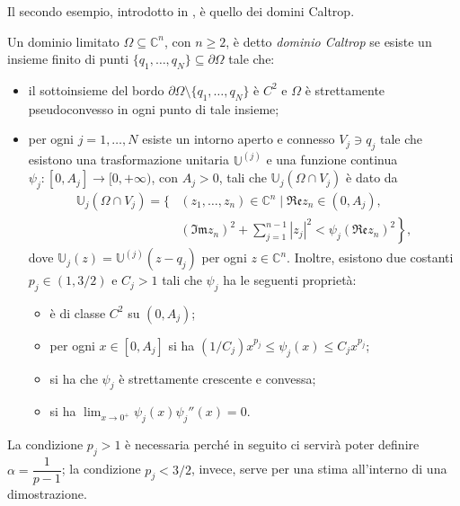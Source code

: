 Il secondo esempio, introdotto in \cite{BM}, è quello dei domini Caltrop.

\begin{defn} \label{defcaltrop}
    Un dominio limitato $\Omega\subseteq\mathbb{C}^n$, con $n\ge 2$, è detto \textit{dominio Caltrop} se esiste un insieme finito di punti $\{q_1,\dots,q_N\}\subseteq\partial\Omega$ tale che:
    \begin{itemize}
        \item il sottoinsieme del bordo $\partial\Omega\setminus\{q_1,\dots,q_N\}$ è $C^2$ e $\Omega$ è strettamente pseudoconvesso in ogni punto di tale insieme;
        \item per ogni $j=1,\dots, N$ esiste un intorno aperto e connesso $V_j\ni q_j$ tale che esistono una trasformazione unitaria $\mathbb{U}^{(j)}$ e una funzione continua $\psi_j:[0,A_j]\longrightarrow[0,+\infty)$, con $A_j>0$, tali che $\mathbb{U}_j(\Omega\cap V_j)$ è dato da
        \begin{align*}
            \mathbb{U}_j(\Omega\cap V_j)=\Bigg\{&(z_1,\dots,z_n)\in\mathbb{C}^n\mid \mathfrak{Re}z_n\in (0,A_j),\\
            &\left.(\mathfrak{Im}z_n)^2+\sum_{j=1}^{n-1}|z_j|^2<\psi_j(\mathfrak{Re}z_n)^2\right\},
        \end{align*}
        dove $\mathbb{U}_j(z)=\mathbb{U}^{(j)}(z-q_j)$ per ogni $z\in\mathbb{C}^n$. Inoltre, esistono due costanti $p_j\in(1,3/2)$ e $C_j>1$ tali che $\psi_j$ ha le seguenti proprietà:
        \begin{itemize}
            \item è di classe $C^2$ su $(0,A_j)$;
            \item per ogni $x\in[0,A_j]$ si ha $(1/C_j)x^{p_j} \le \psi_j(x) \le C_jx^{p_j}$;
            \item si ha che $\psi_j$ è strettamente crescente e convessa;
            \item si ha $\displaystyle\lim_{x\longrightarrow0^+}\psi_j(x)\psi_j''(x)=0$.
        \end{itemize}
    \end{itemize}
\end{defn}

\begin{oss}
    La condizione $p_j>1$ è necessaria perché in seguito ci servirà poter definire $\alpha=\dfrac{1}{p-1}$; la condizione $p_j<3/2$, invece, serve per una stima all'interno di una dimostrazione.
\end{oss}

